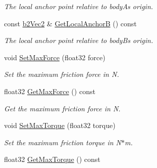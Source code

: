 \begin{DoxyCompactItemize}
\begin{DoxyCompactList}\small\item\em The local anchor point relative to bodyA\textquotesingle{}s origin. \end{DoxyCompactList}\item 
const \hyperlink{structb2_vec2}{b2\+Vec2} \& \hyperlink{classb2_friction_joint_acd57698eb559d36eeac6df00dfd8b89f}{Get\+Local\+AnchorB} () const \hypertarget{classb2_friction_joint_acd57698eb559d36eeac6df00dfd8b89f}{}\label{classb2_friction_joint_acd57698eb559d36eeac6df00dfd8b89f}

\begin{DoxyCompactList}\small\item\em The local anchor point relative to bodyB\textquotesingle{}s origin. \end{DoxyCompactList}\item 
void \hyperlink{classb2_friction_joint_a7936d852b5ad71dc92efc397865dda41}{Set\+Max\+Force} (float32 force)\hypertarget{classb2_friction_joint_a7936d852b5ad71dc92efc397865dda41}{}\label{classb2_friction_joint_a7936d852b5ad71dc92efc397865dda41}

\begin{DoxyCompactList}\small\item\em Set the maximum friction force in N. \end{DoxyCompactList}\item 
float32 \hyperlink{classb2_friction_joint_af3abd33af3943197c89375057302fd0d}{Get\+Max\+Force} () const \hypertarget{classb2_friction_joint_af3abd33af3943197c89375057302fd0d}{}\label{classb2_friction_joint_af3abd33af3943197c89375057302fd0d}

\begin{DoxyCompactList}\small\item\em Get the maximum friction force in N. \end{DoxyCompactList}\item 
void \hyperlink{classb2_friction_joint_a9e3aaf485dc86a378bb62ee78cea43aa}{Set\+Max\+Torque} (float32 torque)\hypertarget{classb2_friction_joint_a9e3aaf485dc86a378bb62ee78cea43aa}{}\label{classb2_friction_joint_a9e3aaf485dc86a378bb62ee78cea43aa}

\begin{DoxyCompactList}\small\item\em Set the maximum friction torque in N$\ast$m. \end{DoxyCompactList}\item 
float32 \hyperlink{classb2_friction_joint_ae59d07030bded21f46a6a432553e71c1}{Get\+Max\+Torque} () const \hypertarget{classb2_friction_joint_ae59d07030bded21f46a6a432553e71c1}{}\label{classb2_friction_joint_ae59d07030bded21f46a6a432553e71c1}


\end{DoxyCompactItemize}
